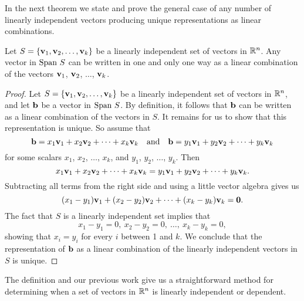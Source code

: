 In the next theorem we state and prove the general case of any number of linearly independent vectors producing unique representations as linear combinations.



\begin{theorem} \label{thm:1_f_unique_representation} Let $S = \{\mathbf{v}_1, \mathbf{v}_2, \ldots, \mathbf{v}_k\}$ be a linearly independent set of vectors in $\mathbb{R}^n$. Any vector in $\text{Span} \ S$ can be written in one and only one way as a linear combination of the vectors $\mathbf{v}_1$, $\mathbf{v}_2$, $\ldots$, $\mathbf{v}_k$.  
\end{theorem}

\begin{proof} Let $S = \{\mathbf{v}_1, \mathbf{v}_2, \ldots, \mathbf{v}_k\}$ be a linearly independent set of vectors in $\mathbb{R}^n$, and let $\mathbf{b}$ be a vector in $\text{Span} \ S$. By definition, it follows that $\mathbf{b}$ can be written as a linear combination of the vectors in $S$. It remains for us to show that this representation is unique. So assume that 
\begin{equation} \label{eq:1_f_1} 
\vb = x_1 \vv_1 + x_2 \vv_2 + \cdots + x_k \vv_k \ \ \text{ and } \ \ \vb = y_1\vv_1 + y_2 \vv_2 + \cdots + y_k \vv_k
\end{equation}
for some scalars $x_1$, $x_2$, $\ldots$, $x_k$, and $y_1$, $y_2$, $\ldots$, $y_k$. Then 
\[x_1 \mathbf{v}_1 + x_2 \mathbf{v}_2 + \cdots + x_k \mathbf{v}_k = y_1\mathbf{v}_1 + y_2 \mathbf{v}_2 + \cdots + y_k \mathbf{v}_k.\]
Subtracting all terms from the right side and using a little vector algebra gives us 
\[(x_1-y_1) \mathbf{v}_1 + (x_2-y_2) \mathbf{v}_2 + \cdots + (x_k-y_k) \mathbf{v}_k = \mathbf{0}.\]
 The fact that $S$ is a linearly independent set implies that 
 \[x_1-y_1=0, \ x_2-y_2 = 0, \ \ldots, \ x_k-y_k=0,\]
showing that $x_i=y_i$ for every $i$ between 1 and $k$. We conclude that the representation of $\mathbf{b}$ as a linear combination of the linearly independent vectors in $S$ is unique. 

\end{proof}


\label{sec:determ_lin_ind}

The definition and our previous work give us a straightforward method for determining when a set of vectors in $\mathbb{R}^n$ is linearly independent or dependent.  



